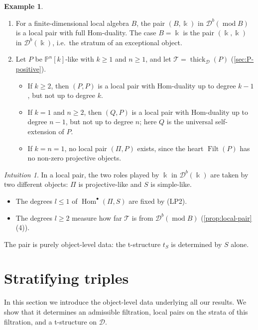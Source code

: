\documentclass[11pt,reqno]{amsart}
\theoremstyle{plain}
\theoremstyle{definition}
\newtheorem{example}[theorem]{Example}
\theoremstyle{remark}
\newtheorem*{intuition}{Intuition}
\newcommand{\kk}{\Bbbk}
\DeclareMathOperator{\Hom}{Hom}
\DeclareMathOperator{\Filt}{Filt}
\newcommand{\modd}{\operatorname{mod}}
\newcommand{\Db}{\mathcal{D}^b}
\newcommand{\thick}[2][\cD]{\operatorname{thick}_{#1}(#2)}
\newcommand{\Pn}[2]{\mathbb{P}^{#1}[#2]}
\newcommand{\cD}{\mathcal{D}}
\newcommand{\cT}{\mathcal{T}}
\begin{document}
\begin{example}\label{ex:local-pairs}
\leavevmode
\begin{enumerate}
\item For a finite-dimensional local algebra $B$, the pair $(B,\kk)$ in $\Db(\modd B)$ is a local pair with full Hom-duality. The case $B=\kk$ is the pair $(\kk,\kk)$ in $\Db(\kk)$, i.e.\ the stratum of an exceptional object.
\item Let $P$ be $\Pn nk$-like with $k\ge1$ and $n\ge1$, and let $\cT=\thick{P}$ (\cref{sec:P-positive}).
\begin{itemize}
\item If $k\ge2$, then $(P,P)$ is a local pair with Hom-duality up to degree $k-1$, but not up to degree $k$.
\item If $k=1$ and $n\ge2$, then $(Q,P)$ is a local pair with Hom-duality up to degree $n-1$, but not up to degree $n$; here $Q$ is the universal self-extension of $P$.
\item If $k=n=1$, no local pair $(\Pi,P)$ exists, since the heart $\Filt(P)$ has no non-zero projective objects.
\end{itemize}
\end{enumerate}
\end{example}

\begin{intuition}
In a local pair, the two roles played by $\kk$ in $\Db(\kk)$ are taken by two different objects: $\Pi$ is projective-like and $S$ is simple-like.
\begin{itemize}
\item The degrees $l\le1$ of $\Hom^\bullet(\Pi,S)$ are fixed by (LP2).
\item The degrees $l\ge2$ measure how far $\cT$ is from $\Db(\modd B)$ (\cref{prop:local-pair}(4)).
\end{itemize}
The pair is purely object-level data: the t-structure $t_S$ is determined by $S$ alone.
\end{intuition}

\section{Stratifying triples}\label{sec:triples}

In this section we introduce the object-level data underlying all our results. We show that it determines an admissible filtration, local pairs on the strata of this filtration, and a t-structure on $\cD$.
\end{document}
